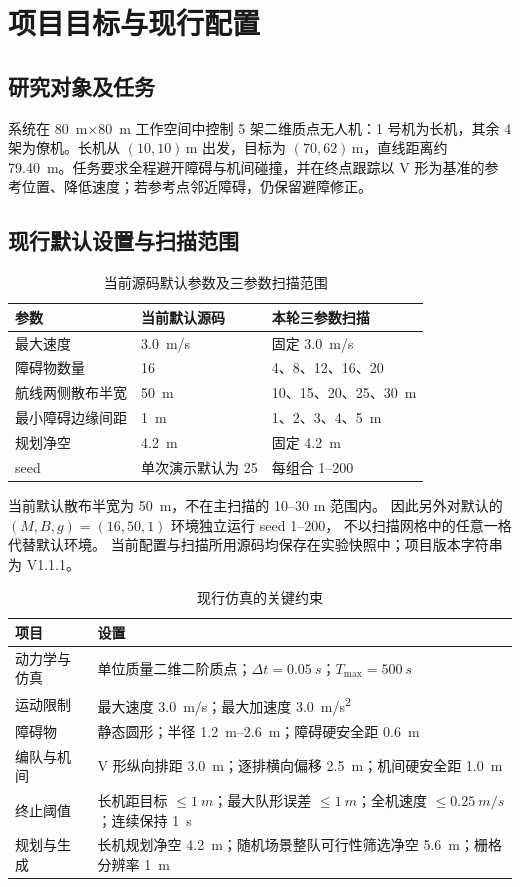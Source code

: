 \documentclass[UTF8,a4paper,11pt,fontset=windows]{ctexart}
\begin{document}
\section{项目目标与现行配置}
\subsection{研究对象及任务}
系统在 \SI{80}{m}$\times$\SI{80}{m} 工作空间中控制 5 架二维质点无人机：1 号机为长机，其余 4 架为僚机。长机从 $(10,10)\,\mathrm m$ 出发，目标为 $(70,62)\,\mathrm m$，直线距离约 \SI{79.40}{m}。任务要求全程避开障碍与机间碰撞，并在终点跟踪以 V 形为基准的参考位置、降低速度；若参考点邻近障碍，仍保留避障修正。

\subsection{现行默认设置与扫描范围}
\begin{table}[H]\centering\small
\caption{当前源码默认参数及三参数扫描范围}
\label{tab:versions}
\begin{tabularx}{0.92\textwidth}{@{}lYY@{}}
\toprule
参数 & 当前默认源码 & 本轮三参数扫描 \\
\midrule
最大速度 & \SI{3.0}{m/s} & 固定 \SI{3.0}{m/s} \\
障碍物数量 & 16 & 4、8、12、16、20 \\
航线两侧散布半宽 & \SI{50}{m} & 10、15、20、25、\SI{30}{m} \\
最小障碍边缘间距 & \SI{1}{m} & 1、2、3、4、\SI{5}{m} \\
规划净空 & \SI{4.2}{m} & 固定 \SI{4.2}{m} \\
seed & 单次演示默认为 25 & 每组合 1--200 \\
\bottomrule
\end{tabularx}
\end{table}
当前默认散布半宽为 \SI{50}{m}，不在主扫描的 10--30 m 范围内。
因此另外对默认的 $(M,B,g)=(16,50,1)$ 环境独立运行 seed 1--200，
不以扫描网格中的任意一格代替默认环境。
当前配置与扫描所用源码均保存在实验快照中；项目版本字符串为 V1.1.1。

\begin{table}[H]\centering\small
\caption{现行仿真的关键约束}
\label{tab:parameters}
\begin{tabularx}{0.94\textwidth}{@{}lY@{}}
\toprule
项目 & 设置 \\
\midrule
动力学与仿真 & 单位质量二维二阶质点；$\Delta t=\SI{0.05}{s}$；$T_{\max}=\SI{500}{s}$ \\
运动限制 & 最大速度 \SI{3.0}{m/s}；最大加速度 \SI{3.0}{m/s^2} \\
障碍物 & 静态圆形；半径 \SIrange{1.2}{2.6}{m}；障碍硬安全距 \SI{0.6}{m} \\
编队与机间 & V 形纵向排距 \SI{3.0}{m}；逐排横向偏移 \SI{2.5}{m}；机间硬安全距 \SI{1.0}{m} \\
终止阈值 & 长机距目标 $\leq\SI{1}{m}$；最大队形误差 $\leq\SI{1}{m}$；全机速度 $\leq\SI{0.25}{m/s}$；连续保持 \SI{1}{s} \\
规划与生成 & 长机规划净空 \SI{4.2}{m}；随机场景整队可行性筛选净空 \SI{5.6}{m}；栅格分辨率 \SI{1}{m} \\
\bottomrule
\end{tabularx}
\end{table}
\end{document}
